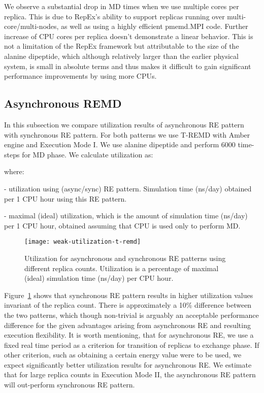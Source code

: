 \documentclass{sig-alternate-05-2015}
\begin{document}
We observe a substantial drop in MD times when we use multiple cores per replica. This is due to RepEx's ability to support replicas running over multi-core/multi-nodes, as well as using a highly efficient pmemd.MPI code. Further increase of CPU cores per replica doesn't demonstrate a linear behavior. This is not a limitation of the RepEx framework but attributable to the size of the alanine dipeptide, which although relatively larger than the earlier physical system, is small in absolute terms and thus makes it difficult to gain significant performance improvements by using more CPUs.

\subsection{Asynchronous REMD} \label{over}

In this subsection we compare utilization results of asynchronous RE pattern with synchronous RE pattern. For both patterns we use T-REMD with Amber engine and Execution Mode I. We use alanine dipeptide and perform 6000 time-steps for MD phase. We calculate utilization as:

 where:
\begin{compactitem}
  \item  - utilization using (async/sync) RE pattern. Simulation time (ns/day) obtained per 1 CPU hour using this RE pattern. 
  \item  - maximal (ideal) utilization, which is the amount of simulation time (ns/day) per 1 CPU hour, obtained assuming that CPU is used only to perform MD. 
\end{compactitem}

\begin{figure}[ht!]
  \centering
  \texttt{[image: weak-utilization-t-remd]}
  \caption{\small{Utilization for asynchronous and synchronous RE patterns using different replica counts. Utilization is a percentage of maximal (ideal) simulation time (ns/day) per CPU hour.  }
  }
  \label{fig:utilization}
\end{figure}

Figure~\ref{fig:utilization} shows that synchronous RE pattern results in higher utilization values invariant of the replica count.  There is approximately a 10\% difference between the two patterns, which though non-trivial is arguably an acceptable performance difference for the given advantages arising from asynchronous RE and resulting execution flexibility. It is worth mentioning, that for asynchronous RE, we use a fixed real time period as a criterion for transition of replicas to exchange phase. If other criterion, such as obtaining a certain energy value were to be used, we expect significantly better utilization results for asynchronous RE. We estimate that for large replica counts in Execution Mode II, the asynchronous RE pattern will out-perform synchronous RE pattern.
\end{document}
